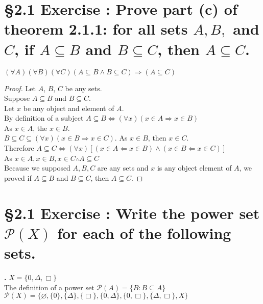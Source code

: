 \documentclass[a4paper,11pt]{article}
\begin{document}
\setcounter{ProblemCounter}{8}
\setcounter{SubsectionCounter}{2}
\section*{\S 2.1 Exercise : Prove part (c) of theorem 2.1.1: for all sets \(A, B,\) and \(C\), if \(A \subseteq B\) and \(B \subseteq C\), then \(A \subseteq C\).}

\begin{theorem2}
\( (\forall A)(\forall B)(\forall C)(A \subseteq B \wedge B \subseteq C) \Rightarrow (A \subseteq C) \)
\begin{proof}
Let \(A\), \(B\), \(C\) be any sets.\\
Suppose \(A \subseteq B\) and \(B \subseteq C\).\\
Let \(x\) be any object and element of \(A\).\\
By definition of a subject \(A \subseteq B \Leftrightarrow (\forall x)(x \in A \Rightarrow x \in 
B)\)\\
As \(x \in A\), the \(x \in B\).\\
\(B \subseteq C \subseteq (\forall x)(x \in B \Rightarrow x \in C)\).
As \(x \in B\), then \(x \in C\).\\
Therefore \(A \subseteq C \Leftrightarrow (\forall x) [(x \in A \Leftarrow x \in B)\wedge (x \in B \Leftarrow x \in 
C)]\)\\
As \(x \in A, x \in B, x \in C \therefore A \subseteq C\)\\
Because we supposed \(A, B, C\) are any sets and \(x\) is any object element of 
\(A\), we proved if \(A \subseteq B\) and \(B \subseteq C\), then \(A \subseteq 
C\).\end{proof}
\end{theorem2}

\newpage

\addtocounter{ProblemCounter}{6}
\addtocounter{SubsectionCounter}{1}
\section*{\S 2.1 Exercise : Write the power set \(\mathcal{P}(X)\) for each of the following sets. }
\textbf{.}
\(X=\{0, \Delta, \Box\}\)\\
The definition of a power set \(\mathcal{P}(A)=\{B: B \subseteq A\}\)\\
\(\mathcal{P}(X)=\{\varnothing, \{0\}, \{\Delta\}, \{\Box\}, \{0, \Delta\}, \{0, \Box\}, \{\Delta, \Box\}, X \}\)
\newpage
\end{document}
